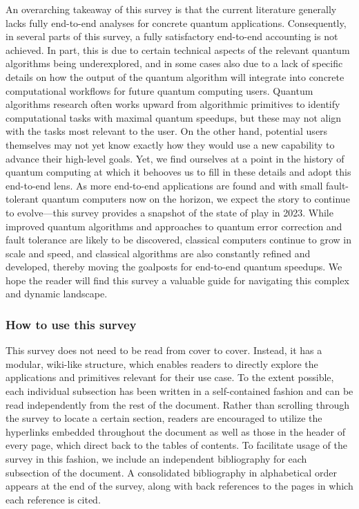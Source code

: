 \documentclass[a4paper,11pt,notitlepage]{report}
\begin{document}
An overarching takeaway of this survey is that the current literature generally lacks fully end-to-end analyses for concrete quantum applications. Consequently, in several parts of this survey, a fully satisfactory end-to-end accounting is not achieved. In part, this is due to certain technical aspects of the relevant quantum algorithms being underexplored, and in some cases also due to a lack of specific details on how the output of the quantum algorithm will integrate into concrete computational workflows for future quantum computing users. Quantum algorithms research often works upward from algorithmic primitives to identify computational tasks with maximal quantum speedups, but these may not align with the tasks most relevant to the user. On the other hand, potential users themselves may not yet know exactly how they would use a new capability to advance their high-level goals. 
Yet, we find ourselves at a point in the history of quantum computing at which it behooves us to fill in these details and adopt this end-to-end lens. As more end-to-end applications are found and with small fault-tolerant quantum computers now on the horizon, we expect the story to continue to evolve---this survey provides a snapshot of the state of play in 2023. 
While improved quantum algorithms and approaches to quantum error correction and fault tolerance are likely to be discovered, classical computers continue to grow in scale and speed, and classical algorithms are also constantly refined and developed, thereby moving the goalposts for end-to-end quantum speedups. We hope the reader will find this survey a valuable guide for navigating this complex and dynamic landscape. 

\subsubsection*{How to use this survey}

This survey does not need to be read from cover to cover. Instead, it has a modular, wiki-like structure, which enables readers to directly explore the applications and primitives relevant for their use case. To the extent possible, each individual subsection has been written in a self-contained fashion and can be read independently from the rest of the document. Rather than scrolling through the survey to locate a certain section, readers are encouraged to utilize the hyperlinks embedded throughout the document as well as those in the header of every page, which direct back to the tables of contents. To facilitate usage of the survey in this fashion, we include an independent bibliography for each subsection of the document. A consolidated bibliography in alphabetical order appears at the end of the survey, along with back references to the pages in which each reference is cited. 
\end{document}

